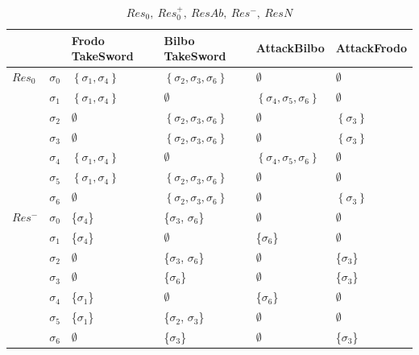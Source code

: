 \documentclass[11pt,a4paper]{article}
\begin{document}
 
    \begin{table}[]
\centering
\label{my-label}
\caption{$Res_0,~ Res_0^+,~ ResAb,~ Res^-,~ ResN$}
\begin{tabular}{|l|l|l|l|l|l|}
\hline
     &   & Frodo TakeSword & Bilbo TakeSword & AttackBilbo & AttackFrodo \\ \hline
$Res_0$ & $\sigma_0$ & $\left\{\sigma_1, \sigma_4\right\}$  & $\left\{\sigma_2, \sigma_3,\sigma_6\right\}$ & $\emptyset$ & $\emptyset$   \\ \hline
     & $\sigma_1$ &  $\left\{\sigma_1, \sigma_4\right\}$  & $\emptyset$ & $\left\{\sigma_4, \sigma_5,\sigma_6\right\}$  &  $\emptyset$  \\ \hline
     & $\sigma_2$ &  $\emptyset$  & $\left\{\sigma_2, \sigma_3,\sigma_6\right\}$ & $\emptyset$   &  $\left\{\sigma_3\right\}$ \\ \hline
     & $\sigma_3$ &  $\emptyset$  & $\left\{\sigma_2, \sigma_3,\sigma_6\right\}$ & $\emptyset$   &  $\left\{\sigma_3\right\}$ \\ \hline
     & $\sigma_4$ &  $\left\{\sigma_1, \sigma_4\right\}$  & $\emptyset$ & $\left\{\sigma_4, \sigma_5,\sigma_6\right\}$   &  $\emptyset$  \\ \hline
     & $\sigma_5$ &  $\left\{\sigma_1, \sigma_4\right\}$  & $\left\{\sigma_2, \sigma_3,\sigma_6\right\}$ & $\emptyset$   &  $\emptyset$  \\ \hline
     & $\sigma_6$ &  $\emptyset$  & $\left\{\sigma_2, \sigma_3,\sigma_6\right\}$ & $\emptyset$   &  $\left\{\sigma_3\right\}$  \\ \hline
$Res^-$ & $\sigma_0$ &  \{$\sigma_4$\} & \{$\sigma_3$, $\sigma_6$\} & $\emptyset$ & $\emptyset$   \\ \hline
     & $\sigma_1$ &  \{$\sigma_4$\}  & $\emptyset$ & \{$\sigma_6$\}   &  $\emptyset$  \\ \hline
     & $\sigma_2$ &  $\emptyset$  & \{$\sigma_3$, $\sigma_6$\} & $\emptyset$   &  \{$\sigma_3$\}  \\ \hline
     & $\sigma_3$ &  $\emptyset$  & \{$\sigma_6$\} & $\emptyset$   &  \{$\sigma_3$\} \\ \hline
     & $\sigma_4$ &  \{$\sigma_1$\}  & $\emptyset$ & \{$\sigma_6$\}   &  $\emptyset$  \\ \hline
     & $\sigma_5$ &  \{$\sigma_1$\}  & \{$\sigma_2$, $\sigma_3$\} & $\emptyset$   &  $\emptyset$  \\ \hline
     & $\sigma_6$ &  $\emptyset$  & \{$\sigma_3$\} & $\emptyset$   &  \{$\sigma_3$\} \\ \hline

\end{tabular}
\end{table}
\end{document}
